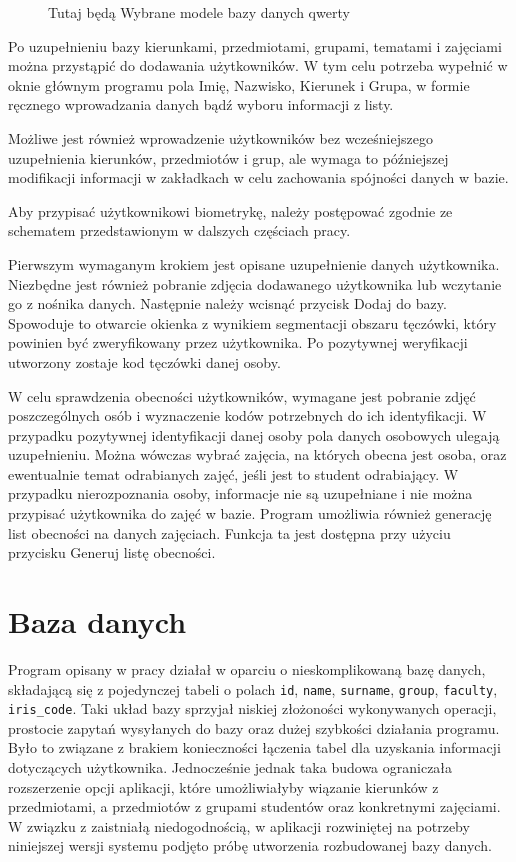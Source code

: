 \begin{figure}
\begin{center}
\caption{Tutaj będą Wybrane modele bazy danych qwerty}
\label{fig:wybraneTabele}
\end{center}
\end{figure}

Po uzupełnieniu bazy kierunkami, przedmiotami, grupami, tematami i zajęciami można przystąpić do dodawania użytkowników. W tym celu potrzeba wypełnić w oknie głównym programu pola Imię, Nazwisko, Kierunek i Grupa, w formie ręcznego wprowadzania danych bądź wyboru informacji z listy.

Możliwe jest również wprowadzenie użytkowników bez wcześniejszego uzupełnienia kierunków, przedmiotów i grup, ale wymaga to późniejszej modifikacji informacji w zakładkach w celu zachowania spójności danych w bazie.

Aby przypisać użytkownikowi biometrykę, należy postępować zgodnie ze schematem przedstawionym w dalszych częściach pracy.

Pierwszym wymaganym krokiem jest opisane uzupełnienie danych użytkownika. Niezbędne jest również pobranie zdjęcia dodawanego użytkownika lub wczytanie  go z nośnika danych. Następnie należy wcisnąć przycisk Dodaj do bazy. Spowoduje to otwarcie okienka z wynikiem segmentacji obszaru tęczówki, który powinien być zweryfikowany przez użytkownika. Po pozytywnej weryfikacji utworzony zostaje kod tęczówki danej osoby.

W celu sprawdzenia obecności użytkowników, wymagane jest pobranie zdjęć poszczególnych osób i wyznaczenie kodów potrzebnych do ich identyfikacji. W przypadku pozytywnej identyfikacji danej osoby pola danych osobowych ulegają uzupełnieniu. Można wówczas wybrać zajęcia, na których obecna jest osoba, oraz ewentualnie temat odrabianych zajęć, jeśli jest to student odrabiający. W przypadku nierozpoznania osoby, informacje nie są uzupełniane i nie można przypisać użytkownika do zajęć w bazie.
Program umożliwia również generację list obecności na danych zajęciach. Funkcja ta jest dostępna przy użyciu przycisku Generuj listę obecności.
\section{Baza danych}
\label{sec:bazadanych}

Program opisany w pracy \cite{Gl11} działał w oparciu o nieskomplikowaną bazę danych, składającą się z pojedynczej tabeli o polach \verb!id!, \verb!name!, \verb!surname!, \verb!group!, \verb!faculty!, \verb!iris_code!. Taki układ bazy sprzyjał niskiej złożoności wykonywanych operacji, prostocie zapytań wysyłanych do bazy oraz dużej szybkości działania programu. Było to związane z brakiem konieczności łączenia tabel dla uzyskania informacji dotyczących użytkownika. Jednocześnie jednak taka budowa ograniczała rozszerzenie opcji aplikacji, które umożliwiałyby wiązanie kierunków z przedmiotami, a przedmiotów z grupami studentów oraz konkretnymi zajęciami. W związku z zaistniałą niedogodnością, w aplikacji rozwiniętej na potrzeby niniejszej wersji systemu podjęto próbę utworzenia rozbudowanej bazy danych.

